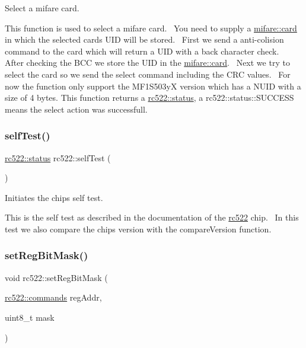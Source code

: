 Select a mifare card. 

This function is used to select a mifare card.~\newline
You need to supply a \hyperlink{classmifare_1_1card}{mifare\+::card} in which the selected cards U\+ID will be stored.~\newline
First we send a anti-\/colision command to the card which will return a U\+ID with a back character check.~\newline
After checking the B\+CC we store the U\+ID in the \hyperlink{classmifare_1_1card}{mifare\+::card}.~\newline
Next we try to select the card so we send the select command including the C\+RC values.~\newline
For now the function only support the M\+F1\+S503yX version which has a N\+U\+ID with a size of 4 bytes. This function returns a \hyperlink{classspiReader_a4bcf984823c38cf4841ebf619e788790}{rc522\+::status}, a rc522\+::status\+::\+S\+U\+C\+C\+E\+SS means the select action was successfull. \mbox{\label{classrc522_ae2b0fd03ac296593e4b031a0308e3233}} 
\subsubsection{\texorpdfstring{self\+Test()}{selfTest()}}
{\footnotesize\ttfamily \hyperlink{classspiReader_a4bcf984823c38cf4841ebf619e788790}{rc522\+::status} rc522\+::self\+Test (\begin{DoxyParamCaption}{ }\end{DoxyParamCaption})}



Initiates the chips self test. 

This is the self test as described in the documentation of the \hyperlink{classrc522}{rc522} chip.~\newline
In this test we also compare the chips version with the compare\+Version function. \mbox{\label{classrc522_a2a6643f07cb56370ce58605b4aa4bde1}} 
\subsubsection{\texorpdfstring{set\+Reg\+Bit\+Mask()}{setRegBitMask()}\hspace{0.1cm}{\footnotesize\ttfamily [1/4]}}
{\footnotesize\ttfamily void rc522\+::set\+Reg\+Bit\+Mask (\begin{DoxyParamCaption}\item[{\hyperlink{classrc522_a6df2359c88d6c2f47faf58bc9e09eaa4}{rc522\+::commands}}]{reg\+Addr,  }\item[{uint8\+\_\+t}]{mask }\end{DoxyParamCaption})}



